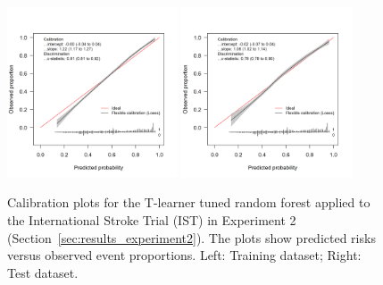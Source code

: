 \begin{figure}[htbp]
\centering
\includegraphics[width=0.45\textwidth]{img/results_IST/IST_tuned_rf_tlearner_train_calibration_plot.png}
\includegraphics[width=0.45\textwidth]{img/results_IST/IST_tuned_rf_tlearner_test_calibration_plot.png}
\caption{Calibration plots for the T-learner tuned random forest applied to the International Stroke Trial (IST) in Experiment 2 (Section~\ref{sec:results_experiment2}). The plots show predicted risks versus observed event proportions. Left: Training dataset; Right: Test dataset.}
\label{fig:calibration_IST_tuned_rf}
\end{figure}


